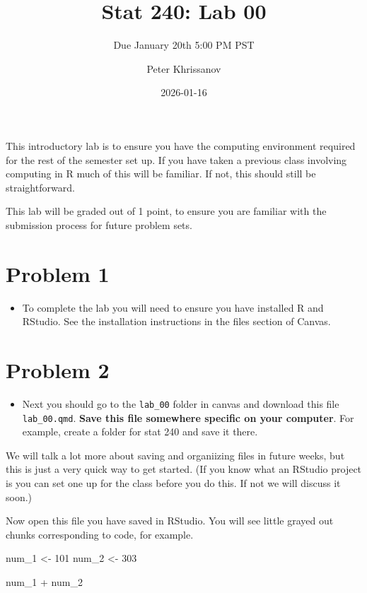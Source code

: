 \documentclass[
  letterpaper,
  DIV=11,
  numbers=noendperiod]{scrartcl}
\title{Stat 240: Lab 00}
\subtitle{Due January 20th 5:00 PM PST}
\author{Peter Khrissanov}
\date{2026-01-16}
\newenvironment{Shaded}{\begin{snugshade}}{\end{snugshade}}
\newcommand{\DecValTok}[1]{\textcolor[rgb]{0.68,0.00,0.00}{#1}}
\newcommand{\NormalTok}[1]{\textcolor[rgb]{0.00,0.23,0.31}{#1}}
\newcommand{\OtherTok}[1]{\textcolor[rgb]{0.00,0.23,0.31}{#1}}
\newcommand{\SpecialCharTok}[1]{\textcolor[rgb]{0.37,0.37,0.37}{#1}}
\providecommand{\tightlist}{%
  \setlength{\itemsep}{0pt}\setlength{\parskip}{0pt}}
\begin{document}
\maketitle


This introductory lab is to ensure you have the computing environment
required for the rest of the semester set up. If you have taken a
previous class involving computing in R much of this will be familiar.
If not, this should still be straightforward.

This lab will be graded out of 1 point, to ensure you are familiar with
the submission process for future problem sets.

\section{Problem 1}\label{problem-1}

\begin{itemize}
\tightlist
\item
  To complete the lab you will need to ensure you have installed R and
  RStudio. See the installation instructions in the files section of
  Canvas.
\end{itemize}

\section{Problem 2}\label{problem-2}

\begin{itemize}
\tightlist
\item
  Next you should go to the \texttt{lab\_00} folder in canvas and
  download this file \texttt{lab\_00.qmd}. \textbf{Save this file
  somewhere specific on your computer}. For example, create a folder for
  stat 240 and save it there.
\end{itemize}

We will talk a lot more about saving and organiizing files in future
weeks, but this is just a very quick way to get started. (If you know
what an RStudio project is you can set one up for the class before you
do this. If not we will discuss it soon.)

Now open this file you have saved in RStudio. You will see little grayed
out chunks corresponding to code, for example.

\begin{Shaded}
\begin{Highlighting}[]
\NormalTok{num\_1 }\OtherTok{\textless{}{-}} \DecValTok{101}
\NormalTok{num\_2 }\OtherTok{\textless{}{-}} \DecValTok{303}

\NormalTok{num\_1 }\SpecialCharTok{+}\NormalTok{ num\_2}
\end{Highlighting}
\end{Shaded}
\end{document}
